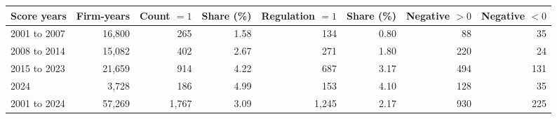 \begin{tabular}{lrrrrrrr}
\toprule
Score years & Firm-years & Count $=1$ & Share (\%) & Regulation $=1$ & Share (\%) & Negative $>0$ & Negative $<0$ \\
\midrule
2001 to 2007 & 16,800 & 265 & 1.58 & 134 & 0.80 & 88 & 35 \\
2008 to 2014 & 15,082 & 402 & 2.67 & 271 & 1.80 & 220 & 24 \\
2015 to 2023 & 21,659 & 914 & 4.22 & 687 & 3.17 & 494 & 131 \\
2024 & 3,728 & 186 & 4.99 & 153 & 4.10 & 128 & 35 \\
\midrule
2001 to 2024 & 57,269 & 1,767 & 3.09 & 1,245 & 2.17 & 930 & 225 \\
\bottomrule
\end{tabular}
